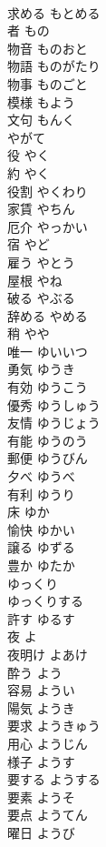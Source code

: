 \documentclass[8pt]{extreport}
\begin{document}
\begin{CJK}{UTF8}{min}
\\	求める	もとめる	
\\	者	もの	
\\	物音	ものおと	
\\	物語	ものがたり	
\\	物事	ものごと	
\\	模様	もよう	
\\	文句	もんく	
\\	やがて		
\\	役	やく	
\\	約	やく	
\\	役割	やくわり	
\\	家賃	やちん	
\\	厄介	やっかい	
\\	宿	やど	
\\	雇う	やとう	
\\	屋根	やね	
\\	破る	やぶる	
\\	辞める	やめる	
\\	稍	やや	
\\	唯一	ゆいいつ	
\\	勇気	ゆうき	
\\	有効	ゆうこう	
\\	優秀	ゆうしゅう	
\\	友情	ゆうじょう	
\\	有能	ゆうのう	
\\	郵便	ゆうびん	
\\	夕べ	ゆうべ	
\\	有利	ゆうり	
\\	床	ゆか	
\\	愉快	ゆかい	
\\	譲る	ゆずる	
\\	豊か	ゆたか	
\\	ゆっくり		
\\	ゆっくりする		
\\	許す	ゆるす	
\\	夜	よ	
\\	夜明け	よあけ	
\\	酔う	よう	
\\	容易	ようい	
\\	陽気	ようき	
\\	要求	ようきゅう	
\\	用心	ようじん	
\\	様子	ようす	
\\	要する	ようする	
\\	要素	ようそ	
\\	要点	ようてん	
\\	曜日	ようび	

\end{CJK}
\end{document}

